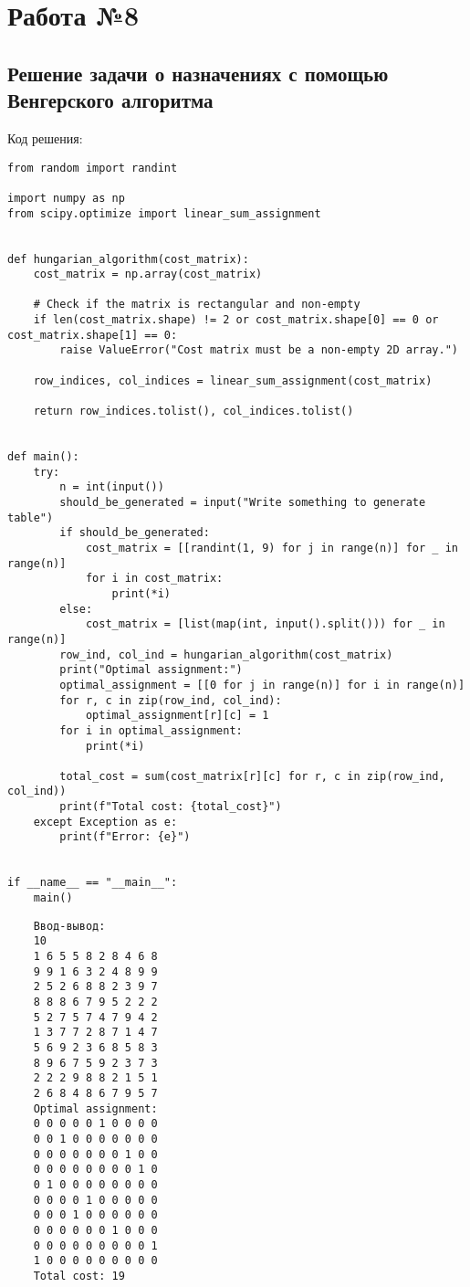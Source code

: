 \documentclass[17pt]{extarticle}
\begin{document}
\section*{Работа №8}
\subsection*{Решение задачи о назначениях с помощью Венгерского алгоритма}
Код решения:
\begin{verbatim}
from random import randint  
  
import numpy as np  
from scipy.optimize import linear_sum_assignment  
  
  
def hungarian_algorithm(cost_matrix):  
    cost_matrix = np.array(cost_matrix)  
  
    # Check if the matrix is rectangular and non-empty  
    if len(cost_matrix.shape) != 2 or cost_matrix.shape[0] == 0 or cost_matrix.shape[1] == 0:  
        raise ValueError("Cost matrix must be a non-empty 2D array.")  
  
    row_indices, col_indices = linear_sum_assignment(cost_matrix)  
  
    return row_indices.tolist(), col_indices.tolist()  
  
  
def main():  
    try:  
        n = int(input())  
        should_be_generated = input("Write something to generate table")  
        if should_be_generated:  
            cost_matrix = [[randint(1, 9) for j in range(n)] for _ in range(n)]  
            for i in cost_matrix:  
                print(*i)  
        else:  
            cost_matrix = [list(map(int, input().split())) for _ in range(n)]  
        row_ind, col_ind = hungarian_algorithm(cost_matrix)  
        print("Optimal assignment:")  
        optimal_assignment = [[0 for j in range(n)] for i in range(n)]  
        for r, c in zip(row_ind, col_ind):  
            optimal_assignment[r][c] = 1  
        for i in optimal_assignment:  
            print(*i)  
  
        total_cost = sum(cost_matrix[r][c] for r, c in zip(row_ind, col_ind))  
        print(f"Total cost: {total_cost}")  
    except Exception as e:  
        print(f"Error: {e}")  
  
  
if __name__ == "__main__":  
    main()
\end{verbatim}
\begin{verbatim}
    Ввод-вывод:
    10
    1 6 5 5 8 2 8 4 6 8
    9 9 1 6 3 2 4 8 9 9
    2 5 2 6 8 8 2 3 9 7
    8 8 8 6 7 9 5 2 2 2
    5 2 7 5 7 4 7 9 4 2
    1 3 7 7 2 8 7 1 4 7
    5 6 9 2 3 6 8 5 8 3
    8 9 6 7 5 9 2 3 7 3
    2 2 2 9 8 8 2 1 5 1
    2 6 8 4 8 6 7 9 5 7
    Optimal assignment:
    0 0 0 0 0 1 0 0 0 0
    0 0 1 0 0 0 0 0 0 0
    0 0 0 0 0 0 0 1 0 0
    0 0 0 0 0 0 0 0 1 0
    0 1 0 0 0 0 0 0 0 0
    0 0 0 0 1 0 0 0 0 0
    0 0 0 1 0 0 0 0 0 0
    0 0 0 0 0 0 1 0 0 0
    0 0 0 0 0 0 0 0 0 1
    1 0 0 0 0 0 0 0 0 0
    Total cost: 19
\end{verbatim}
\end{document}
